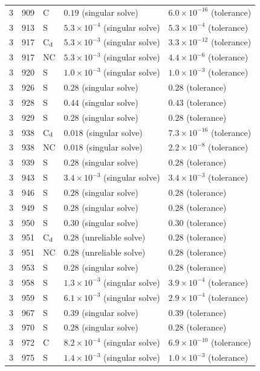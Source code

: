 \begin{tabular}{@{}rrl ll@{}}
3 & 909 & C & $0.19$ (singular solve) & $6.0\times10^{-16}$ (tolerance)\\
3 & 913 & S & $5.3\times10^{-4}$ (singular solve) & $5.3\times10^{-4}$ (tolerance)\\
3 & 917 & C$_{\rm d}$ & $5.3\times10^{-3}$ (singular solve) & $3.3\times10^{-12}$ (tolerance)\\
3 & 917 & NC & $5.3\times10^{-3}$ (singular solve) & $4.4\times10^{-6}$ (tolerance)\\
3 & 920 & S & $1.0\times10^{-3}$ (singular solve) & $1.0\times10^{-3}$ (tolerance)\\
3 & 926 & S & $0.28$ (singular solve) & $0.28$ (tolerance)\\
3 & 928 & S & $0.44$ (singular solve) & $0.43$ (tolerance)\\
3 & 929 & S & $0.28$ (singular solve) & $0.28$ (tolerance)\\
3 & 938 & C$_{\rm d}$ & $0.018$ (singular solve) & $7.3\times10^{-16}$ (tolerance)\\
3 & 938 & NC & $0.018$ (singular solve) & $2.2\times10^{-8}$ (tolerance)\\
3 & 939 & S & $0.28$ (singular solve) & $0.28$ (tolerance)\\
3 & 943 & S & $3.4\times10^{-3}$ (singular solve) & $3.4\times10^{-3}$ (tolerance)\\
3 & 946 & S & $0.28$ (singular solve) & $0.28$ (tolerance)\\
3 & 949 & S & $0.28$ (singular solve) & $0.28$ (tolerance)\\
3 & 950 & S & $0.30$ (singular solve) & $0.30$ (tolerance)\\
3 & 951 & C$_{\rm d}$ & $0.28$ (unreliable solve) & $0.28$ (tolerance)\\
3 & 951 & NC & $0.28$ (unreliable solve) & $0.28$ (tolerance)\\
3 & 953 & S & $0.28$ (singular solve) & $0.28$ (tolerance)\\
3 & 958 & S & $1.3\times10^{-3}$ (singular solve) & $3.9\times10^{-4}$ (tolerance)\\
3 & 959 & S & $6.1\times10^{-3}$ (singular solve) & $2.9\times10^{-4}$ (tolerance)\\
3 & 967 & S & $0.39$ (singular solve) & $0.39$ (tolerance)\\
3 & 970 & S & $0.28$ (singular solve) & $0.28$ (tolerance)\\
3 & 972 & C & $8.2\times10^{-4}$ (singular solve) & $6.9\times10^{-10}$ (tolerance)\\
3 & 975 & S & $1.4\times10^{-3}$ (singular solve) & $1.0\times10^{-3}$ (tolerance)\\

\end{tabular}
